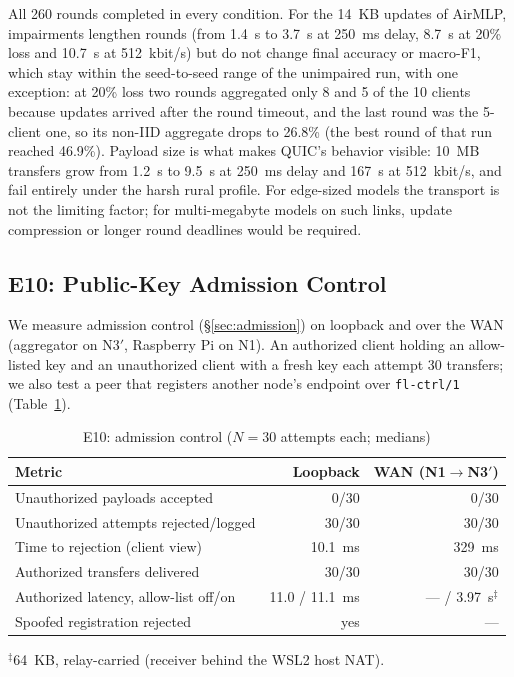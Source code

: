 All 260 rounds completed in every condition. For the 14~KB updates of AirMLP, impairments lengthen rounds (from 1.4~s to 3.7~s at 250~ms delay, 8.7~s at 20\% loss and 10.7~s at 512~kbit/s) but do not change final accuracy or macro-F1, which stay within the seed-to-seed range of the unimpaired run, with one exception: at 20\% loss two rounds aggregated only 8 and 5 of the 10 clients because updates arrived after the round timeout, and the last round was the 5-client one, so its non-IID aggregate drops to 26.8\% (the best round of that run reached 46.9\%). Payload size is what makes QUIC's behavior visible: 10~MB transfers grow from 1.2~s to 9.5~s at 250~ms delay and 167~s at 512~kbit/s, and fail entirely under the harsh rural profile. For edge-sized models the transport is not the limiting factor; for multi-megabyte models on such links, update compression or longer round deadlines would be required.

\subsection{E10: Public-Key Admission Control}
\label{sec:e10}

We measure admission control (\S\ref{sec:admission}) on loopback and over the WAN (aggregator on N3$'$, Raspberry Pi on N1). An authorized client holding an allow-listed key and an unauthorized client with a fresh key each attempt 30 transfers; we also test a peer that registers another node's endpoint over \texttt{fl-ctrl/1} (Table~\ref{tab:e10}).

\begin{table}[t]
\centering
\caption{E10: admission control ($N{=}30$ attempts each; medians)}
\label{tab:e10}
\scriptsize
\setlength{\tabcolsep}{3pt}
\begin{tabular}{@{}l r r@{}}
\toprule
\textbf{Metric} & \textbf{Loopback} & \textbf{WAN (N1$\to$N3$'$)} \\
\midrule
Unauthorized payloads accepted        & 0/30     & 0/30 \\
Unauthorized attempts rejected/logged & 30/30    & 30/30 \\
Time to rejection (client view)       & 10.1~ms  & 329~ms \\
Authorized transfers delivered        & 30/30    & 30/30 \\
Authorized latency, allow-list off/on & 11.0 / 11.1~ms & --- / 3.97~s$^{\ddagger}$ \\
Spoofed registration rejected         & yes      & --- \\
\bottomrule
\end{tabular}
\vspace{0.3em}

{\scriptsize $^{\ddagger}$64~KB, relay-carried (receiver behind the WSL2 host NAT).}
\end{table}

